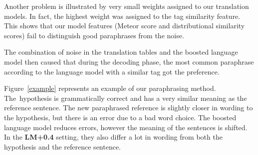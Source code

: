 \documentclass[11pt]{article}
\def\Fref#1{Figure~\ref{#1}}
\begin{document}
Another problem is illustrated by very small weights assigned to our 
translation models. In fact, the highest weight was assigned to the tag 
similarity feature. This shows that our model features (Meteor score and 
distributional similarity scores) fail to distinguish good paraphrases from the 
noise. 

The combination of noise in the translation tables and the boosted language
model then caused that during the decoding phase, the most common paraphrase
according to the language model with a similar tag got the preference. 

\Fref{example} represents an example of our paraphrasing method. The~hypothesis 
is grammatically correct and has a very similar meaning as the reference 
sentence. The new paraphrased reference is slightly closer in wording to the 
hypothesis, but there is an error due to a bad word choice. The boosted 
language model reduces errors, however the meaning of the sentences is shifted. 
In the \textbf{LM+0.4} setting, they also differ a lot in wording from both the 
hypothesis and the reference sentence.
\end{document}
